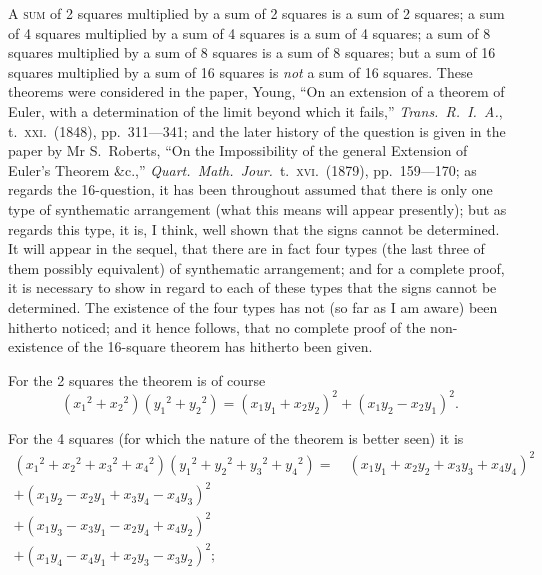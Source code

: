 \documentclass[11pt,a4paper]{book}
\begin{document}
\textsc{A} \textsc{sum} of 2 squares multiplied by a sum of 2 squares is a sum of 2 squares; a sum of 4 squares multiplied by a sum of 4 squares is a sum of 4 squares; a sum of 8 squares multiplied by a sum of 8 squares is a sum of 8 squares; but a sum of 16 squares multiplied by a sum of 16 squares is \textit{not} a sum of 16 squares. These theorems were considered in the paper, Young, ``On an extension of a theorem of Euler, with a determination of the limit beyond which it fails,'' \textit{Trans.\ R.\ I.\ A.}, t.\ \textsc{xxi}.\ (1848), pp.\ 311---341; and the later history of the question is given in the paper by Mr S.\ Roberts, ``On the Impossibility of the general Extension of Euler's Theorem \&c.,'' \textit{Quart.\ Math.\ Jour.}\ t.\ \textsc{xvi}.\ (1879), pp.\ 159---170; as regards the 16-question, it has been throughout assumed that there is only one type of synthematic arrangement (what this means will appear presently); but as regards this type, it is, I think, well shown that the signs cannot be determined. It will appear in the sequel, that there are in fact four types (the last three of them possibly equivalent) of synthematic arrangement; and for a complete proof, it is necessary to show in regard to each of these types that the signs cannot be determined. The existence of the four types has not (so far as I am aware) been hitherto noticed; and it hence follows, that no complete proof of the non-existence of the 16-square theorem has hitherto been given.

For the 2 squares the theorem is of course
\[
({x_1}^2 + {x_2}^2)({y_1}^2 + {y_2}^2) = (x_1y_1 + x_2y_2)^2 + (x_1y_2 - x_2y_1)^2.
\]

For the 4 squares (for which the nature of the theorem is better seen) it is
\begin{multline*}
({x_1}^2 + {x_2}^2 + {x_3}^2 + {x_4}^2)({y_1}^2 + {y_2}^2 + {y_3}^2 + {y_4}^2) = \quad (x_1y_1 + x_2y_2 + x_3y_3 + x_4y_4)^2 \\
+ (x_1y_2 - x_2y_1 + x_3y_4 - x_4y_3)^2 \\
+ (x_1y_3 - x_3y_1 - x_2y_4 + x_4y_2)^2 \\
+ (x_1y_4 - x_4y_1 + x_2y_3 - x_3y_2)^2;
\end{multline*}
\end{document}
